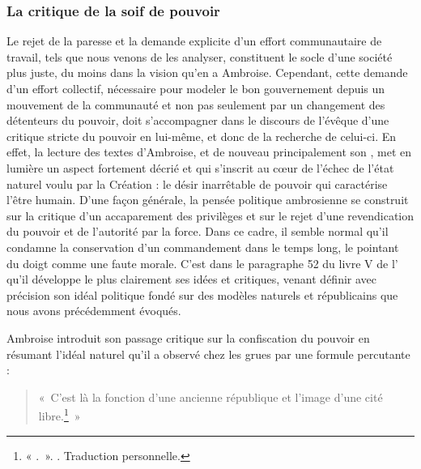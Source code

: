 \bigskip

\subsubsection{La critique de la soif de pouvoir}

Le rejet de la paresse et la demande explicite d’un effort communautaire de travail, tels que nous venons de les analyser, constituent le socle d'une société plus juste, du moins dans la vision qu'en a Ambroise. Cependant, cette demande d'un effort collectif, nécessaire pour modeler le bon gouvernement depuis un mouvement de la communauté et non pas seulement par un changement des détenteurs du pouvoir, doit s'accompagner dans le discours de l'évêque d'une critique stricte du pouvoir en lui-même, et donc de la recherche de celui-ci. En effet, la lecture des textes d'Ambroise, et de nouveau principalement son , met en lumière un aspect fortement décrié et qui s'inscrit au cœur de l'échec de l'état naturel voulu par la Création : le désir inarrêtable de pouvoir qui caractérise l'être humain. D'une façon générale, la pensée politique ambrosienne se construit sur la critique d'un accaparement des privilèges et sur le rejet d'une revendication du pouvoir et de l'autorité par la force. Dans ce cadre, il semble normal qu'il condamne la conservation d'un commandement dans le temps long, le pointant du doigt comme une faute morale. C'est dans le paragraphe 52 du livre V de l' qu'il développe le plus clairement ses idées et critiques, venant définir avec précision son idéal politique fondé sur des modèles naturels et républicains que nous avons précédemment évoqués.

\bigskip

Ambroise introduit son passage critique sur la confiscation du pouvoir en résumant l'idéal naturel qu'il a observé chez les grues par une formule percutante :

\bigskip

\begin{quote}
    «~C'est là la fonction d'une ancienne république et l'image d'une cité libre.\footnote{« .~». \cite[\nopp V, 15, 52]{ambroise_csel_32_1}. Traduction personnelle.}~»
\end{quote}

\bigskip

